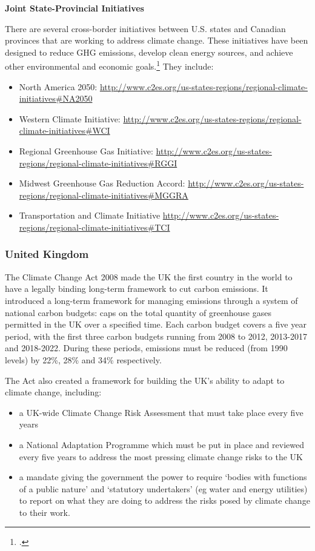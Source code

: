 \textbf{Joint State-Provincial Initiatives}



There are several cross-border initiatives between U.S. states and Canadian provinces that are working to address climate change. These initiatives have been designed to reduce GHG emissions, develop clean energy sources, and achieve other environmental and economic goals.\footcite[][]{CCESinitiatives} They include:
\begin{itemize}
	\item North America 2050: \url{http://www.c2es.org/us-states-regions/regional-climate-initiatives#NA2050}
	\item Western Climate Initiative: \url{http://www.c2es.org/us-states-regions/regional-climate-initiatives#WCI}
	\item Regional Greenhouse Gas Initiative: \url{http://www.c2es.org/us-states-regions/regional-climate-initiatives#RGGI}
	\item Midwest Greenhouse Gas Reduction Accord: \url{http://www.c2es.org/us-states-regions/regional-climate-initiatives#MGGRA}
	\item Transportation and Climate Initiative \url{http://www.c2es.org/us-states-regions/regional-climate-initiatives#TCI}
\end{itemize}


	\subsubsection{United Kingdom}

The Climate Change Act 2008 made the UK the first country in the world to have a legally binding long-term framework to cut carbon emissions.  It introduced a long-term framework for managing emissions through a system of national carbon budgets: caps on the total quantity of greenhouse gases permitted in the UK over a specified time. Each carbon budget covers a five year period, with the first three carbon budgets running from 2008 to 2012, 2013-2017 and 2018-2022. During these periods, emissions must be reduced (from 1990 levels) by 22\%, 28\% and 34\% respectively.

The Act also created a framework for building the UK’s ability to adapt to climate change, including:
\begin{itemize}
	\item a UK-wide Climate Change Risk Assessment that must take place every five years
	\item a National Adaptation Programme which must be put in place and reviewed every five years to address the most pressing climate change risks to the UK
	\item a mandate giving the government the power to require ‘bodies with functions of a public nature’ and ‘statutory undertakers’ (eg water and energy utilities) to report on what they are doing to address the risks posed by climate change to their work.
\end{itemize}


